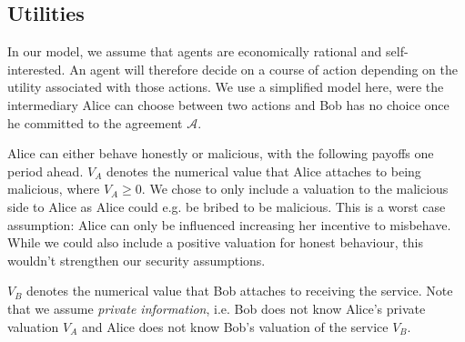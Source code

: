 \documentclass[runningheads]{llncs}
\newcommand{\sys}{Promise\xspace}
\newcommand{\rk}[1]{\todo[linecolor=red,backgroundcolor=red!25,bordercolor=blue,inline,caption={}]{Comment by Rami: #1}}
\newcommand{\dom}[1]{\todo[linecolor=green,backgroundcolor=green!25,bordercolor=green,inline,caption={}]{Comment by Dominik: #1}}
\begin{document}



\subsection{Utilities}
In our model, we assume that agents are economically rational and self-interested.
An agent will therefore decide on a course of action depending on the utility associated with those actions.
We use a simplified model here, were the intermediary Alice can choose between two actions and Bob has no choice once he committed to the agreement $\mathcal{A}$.

Alice can either behave honestly or malicious, with the following payoffs one period ahead.
$V_A$ denotes the numerical value that Alice attaches to being malicious, where $V_A \geq 0$.
We chose to only include a valuation to the malicious side to Alice as Alice could e.g. be bribed to be malicious.
This is a worst case assumption: Alice can only be influenced increasing her incentive to misbehave.
While we could also include a positive valuation for honest behaviour, this wouldn't strengthen our security assumptions.

$V_B$ denotes the numerical value that Bob attaches to receiving the service.
Note that we assume \emph{private information}, i.e. Bob does not know Alice's private valuation $V_A$ and Alice does not know Bob's valuation of the service $V_B$.
\end{document}
